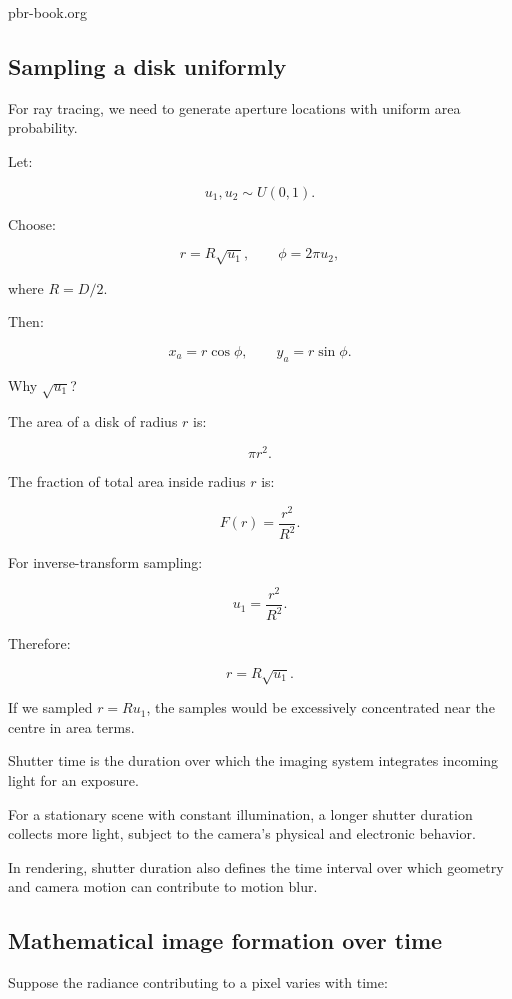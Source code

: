 pbr-book.org

\subsection{Sampling a disk uniformly}\label{02-foundations-ii-ch036-sampling-a-disk-uniformly}

For ray tracing, we need to generate aperture locations with uniform area probability.

Let:

\[ u_1,u_2\sim U(0,1). \]

Choose:

\[ \boxed{ r=R\sqrt{u_1}, \qquad \phi=2\pi u_2, } \]

where \(R=D/2\).

Then:

\[ \boxed{ x_a=r\cos\phi, \qquad y_a=r\sin\phi. } \]

Why \(\sqrt{u_1}\)?

The area of a disk of radius \(r\) is:

\[ \pi r^2. \]

The fraction of total area inside radius \(r\) is:

\[ F(r)=\frac{r^2}{R^2}. \]

For inverse-transform sampling:

\[ u_1=\frac{r^2}{R^2}. \]

Therefore:

\[ \boxed{r=R\sqrt{u_1}}. \]

If we sampled \(r=Ru_1\), the samples would be excessively concentrated near the centre in area terms.

Shutter time is the duration over which the imaging system integrates incoming light for an exposure.

For a stationary scene with constant illumination, a longer shutter duration collects more light, subject to the camera's physical and electronic behavior.

In rendering, shutter duration also defines the time interval over which geometry and camera motion can contribute to motion blur.

\subsection{Mathematical image formation over time}\label{02-foundations-ii-ch036-mathematical-image-formation-over-time}

Suppose the radiance contributing to a pixel varies with time:

